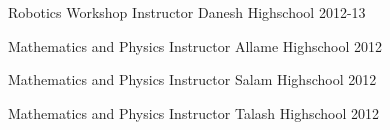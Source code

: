 \begin{cvhonors}
  \cvhonor
    {Robotics Workshop} %
    {Instructor} %
    {Danesh Highschool} %
    {2012-13} %

  \cvhonor
    {Mathematics and Physics} %
    {Instructor} %
    {Allame Highschool} %
    {2012} %

  \cvhonor
    {Mathematics and Physics} %
    {Instructor} %
    {Salam Highschool} %
    {2012} %

  \cvhonor
    {Mathematics and Physics} %
    {Instructor} %
    {Talash Highschool} %
    {2012} %

\end{cvhonors}
